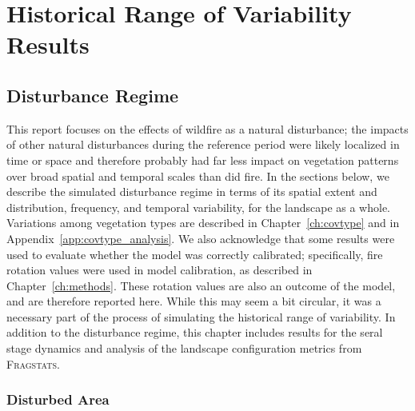
\chapter{Historical Range of Variability Results}
\section{Disturbance Regime}

This report focuses on the effects of wildfire as a natural disturbance; the impacts of other natural disturbances during the reference period were likely localized in time or space and therefore probably had far less impact on vegetation patterns over broad spatial and temporal scales than did fire. In the sections below, we describe the simulated disturbance regime in terms of its spatial extent and distribution, frequency, and temporal variability, for the landscape as a whole. Variations among vegetation types are described in Chapter~\ref{ch:covtype} and in Appendix~\ref{app:covtype_analysis}. We also acknowledge that some results were used to evaluate whether the model was correctly calibrated; specifically, fire rotation values were used in model calibration, as described in Chapter~\ref{ch:methods}. These rotation values are also an outcome of the model, and are therefore reported here. While this may seem a bit circular, it was a necessary part of the process of simulating the historical range of variability. In addition to the disturbance regime, this chapter includes results for the seral stage dynamics and analysis of the landscape configuration metrics from \textsc{Fragstats}.


\subsection{Disturbed Area} 

